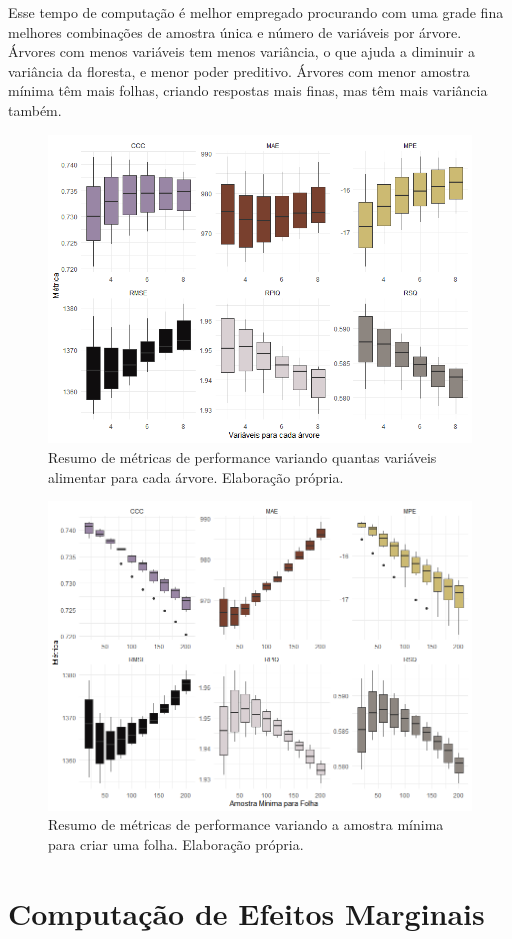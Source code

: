 Esse tempo de computação é melhor empregado procurando com uma grade fina melhores combinações de amostra única e número de variáveis por árvore. Árvores com menos variáveis tem menos variância, o que ajuda a diminuir a variância da floresta, e menor poder preditivo. Árvores com menor amostra mínima têm mais folhas, criando respostas mais finas, mas têm mais variância também. 


\begin{figure}[H]
    \centering
    \includegraphics[scale = .72]{imagens/cross_v_mtry.png}
    \caption{Resumo de métricas de performance variando quantas variáveis alimentar para cada árvore. Elaboração própria.}
\end{figure}


\begin{figure}[H]
    \centering
    \includegraphics[scale = .70]{imagens/crossv_min.png}
    \caption{Resumo de métricas de performance variando a amostra mínima para criar uma folha. Elaboração própria.}
\end{figure}




\section{Computação de Efeitos Marginais}
